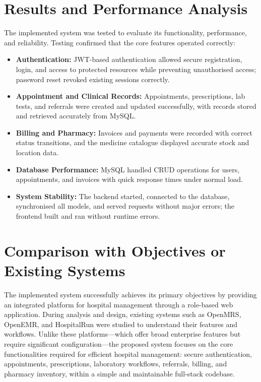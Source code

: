 \documentclass[12pt,a4paper]{report}
\begin{document}
\section{Results and Performance Analysis}
The implemented system was tested to evaluate its functionality, performance, and
reliability. Testing confirmed that the core features operated correctly:
\begin{itemize}[leftmargin=1.4em]
  \item \textbf{Authentication:} JWT-based authentication allowed secure registration,
        login, and access to protected resources while preventing unauthorised access;
        password reset revoked existing sessions correctly.
  \item \textbf{Appointment and Clinical Records:} Appointments, prescriptions, lab
        tests, and referrals were created and updated successfully, with records stored
        and retrieved accurately from MySQL.
  \item \textbf{Billing and Pharmacy:} Invoices and payments were recorded with correct
        status transitions, and the medicine catalogue displayed accurate stock and
        location data.
  \item \textbf{Database Performance:} MySQL handled CRUD operations for users,
        appointments, and invoices with quick response times under normal load.
  \item \textbf{System Stability:} The backend started, connected to the database,
        synchronised all models, and served requests without major errors; the frontend
        built and ran without runtime errors.
\end{itemize}

\section{Comparison with Objectives or Existing Systems}
The implemented system successfully achieves its primary objectives by providing an
integrated platform for hospital management through a role-based web application.
During analysis and design, existing systems such as OpenMRS, OpenEMR, and HospitalRun
were studied to understand their features and workflows. Unlike these platforms---which
offer broad enterprise features but require significant configuration---the proposed
system focuses on the core functionalities required for efficient hospital management:
secure authentication, appointments, prescriptions, laboratory workflows, referrals,
billing, and pharmacy inventory, within a simple and maintainable full-stack codebase.
\end{document}

